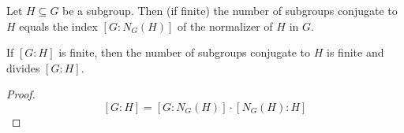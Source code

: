 \begin{lemma}
\label{numofconjugatesubgroups}
Let $H \subseteq G$ be a subgroup. Then (if finite) the number of subgroups conjugate to $H$ equals the index
$[G : N_G(H)]$ of the normalizer of $H$ in $G$.
\end{lemma}

\begin{corollary}
\label{cornumofconjugatesubgroups}
If $[G:H]$ is finite, then the number of subgroups conjugate to $H$ is finite and divides $[G:H]$.
\end{corollary}

\begin{proof}
$$[G : H] = [G : N_G(H)] \cdot [N_G(H) : H]$$
\end{proof}